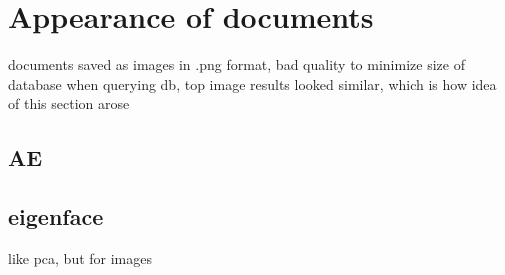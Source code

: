 \section{Appearance of documents}\label{sec:appearance}
documents saved as images in .png format, bad quality to minimize size of database
when querying db, top image results looked similar, which is how idea of this section arose

\subsection{AE}\label{subsec:autoencoder}

\subsection{eigenface}\label{subsec:eigenface}
like pca, but for images


